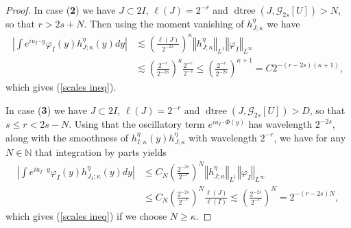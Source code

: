 \documentclass{amsart}%
\theoremstyle{plain}
\numberwithin{equation}{section}
\begin{document}
\begin{proof}
In case (\textbf{2}) we have $J\subset2I$, $\ell\left(  J\right)  =2^{-r}$ and
$\operatorname*{dtree}\left(  J,\mathcal{G}_{2s}\left[  U\right]  \right)
>N$, so that $r>2s+N$. Then using the moment vanishing of $h_{J;\kappa}^{\eta
}$ we have%
\begin{align*}
\left\vert \int e^{iu_{I}\cdot y}\varphi_{I}\left(  y\right)  h_{J;\kappa
}^{\eta}\left(  y\right)  dy\right\vert  & \lesssim\left(  \frac{\ell\left(
J\right)  }{2^{-2s}}\right)  ^{\kappa}\left\Vert h_{J;\kappa}^{\eta
}\right\Vert _{L^{1}}\left\Vert \varphi_{I}\right\Vert _{L^{\infty}}\\
& \lesssim\left(  \frac{2^{-r}}{2^{-2s}}\right)  ^{\kappa}\frac{2^{-r}}%
{2^{-s}}\leq\left(  \frac{2^{-r}}{2^{-2s}}\right)  ^{\kappa+1}=C2^{-\left(
r-2s\right)  \left(  \kappa+1\right)  },
\end{align*}
which gives (\ref{scales ineq}).

In case (\textbf{3}) we have $J\subset2I$, $\ell\left(  J\right)  =2^{-r}$ and
$\operatorname*{dtree}\left(  J,\mathcal{G}_{2s}\left[  U\right]  \right)
>D$, so that $s\leq r<2s-N$. Using that the oscillatory term $e^{iu_{I}%
\cdot\Phi\left(  y\right)  }$ has wavelength $2^{-2s}$, along with the
smoothness of $h_{I;\kappa}^{\eta}\left(  y\right)  h_{J;\kappa}^{\eta}$ with
wavelength $2^{-r}$, we have for any $N\in\mathbb{N}$ that integration by
parts yields%
\begin{align*}
\left\vert \int e^{iu_{I}\cdot y}\varphi_{I}\left(  y\right)  h_{J_{1};\kappa
}^{\eta}\left(  y\right)  dy\right\vert  & \leq C_{N}\left(  \frac{2^{-2s}%
}{2^{-r}}\right)  ^{N}\left\Vert h_{J;\kappa}^{\eta}\right\Vert _{L^{1}%
}\left\Vert \varphi_{I}\right\Vert _{L^{\infty}}\\
& \leq C_{N}\left(  \frac{2^{-2s}}{2^{-r}}\right)  ^{N}\frac{\ell\left(
J\right)  }{\ell\left(  I\right)  }\lesssim\left(  \frac{2^{-2s}}{2^{-r}%
}\right)  ^{N}=2^{-\left(  r-2s\right)  N},
\end{align*}
which gives (\ref{scales ineq}) if we choose $N\geq\kappa$.


\end{proof}
\end{document}
